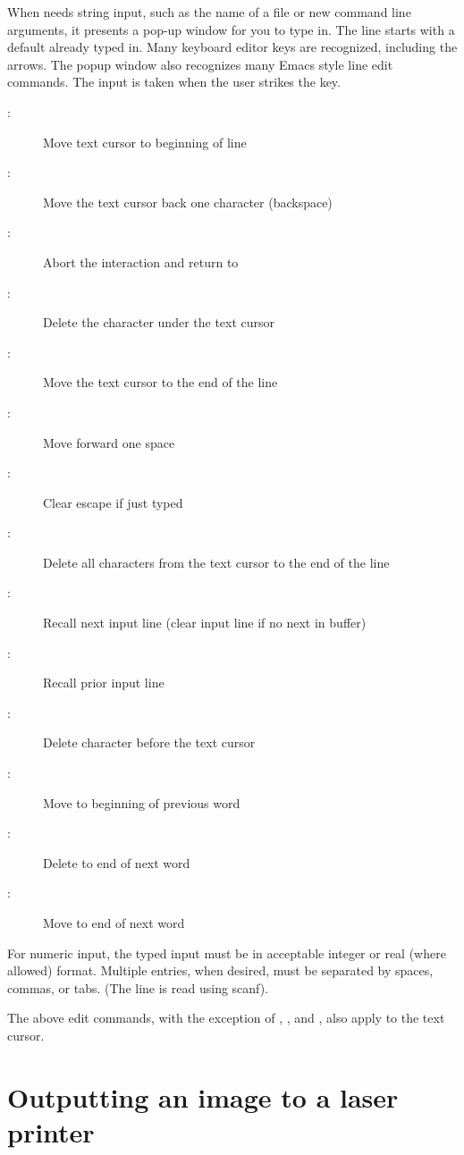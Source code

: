     When {\SAO} needs string input, such as the name of a file or new
    command line arguments, it presents a pop-up window for you to
    type in.  The line starts with a default already typed in.  Many
    keyboard editor keys are recognized, including the arrows.  The
    popup window also recognizes many Emacs style line edit commands.
    The input is taken when the user strikes the  key.
\begin{description}
\item[:]   Move text cursor to beginning of line
\item[:]   Move the text cursor back one character (backspace)
\item[:]   Abort the interaction and return to {\SAO}
\item[:]   Delete the character under the text cursor
\item[:]   Move the text cursor to the end of the line
\item[:]   Move forward one space
\item[:]   Clear escape if just typed
\item[:]   Delete all characters from the text cursor to the end of the line
\item[:]   Recall next input line (clear input line if no next in buffer)
\item[:]   Recall prior input line
\item[:]   Delete character before the text cursor
\item[:] Move to beginning of previous word
\item[:] Delete to end of next word
\item[:] Move to end of next word
\end{description}

    For numeric input, the typed input must be in acceptable integer or
    real (where allowed) format.  Multiple entries, when desired, must be
    separated by spaces, commas, or tabs.  (The line is read using scanf).

    The above edit commands, with the exception of , ,
    and , also apply to the text cursor.

\section{ Outputting an image to a laser printer } \label{hdcp-sec}

